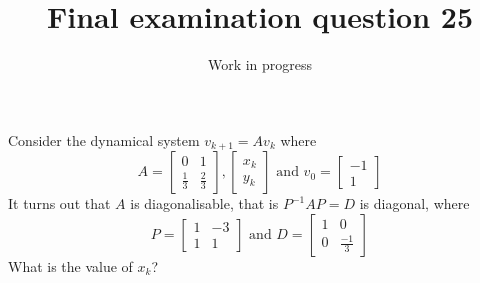 \documentclass{article}
\title{Final examination question 25}
\author{Work in progress}
\begin{document}
\maketitle

\begin{Exercise}
  Consider the dynamical system $v_{k+1} = A v_k$ where
  \begin{equation*}
  A = \left[
  \begin{array}{cc}
  0&1\\
  \frac{1}{3} & \frac{2}{3}
  \end{array}
  \right], \left[
  \begin{array}{c}
  x_k\\
  y_k
  \end{array}
  \right]\text{ and } v_0 = \left[
  \begin{array}{c}
  -1\\
  1
  \end{array}
  \right]
  \end{equation*}
  It turns out that $A$ is diagonalisable, that is $P^{-1}AP = D$ is diagonal, where
  \begin{equation*}
  P= \left[
  \begin{array}{cc}
  1&-3\\
  1&1
  \end{array}
  \right]\text{ and }
  D = \left[
  \begin{array}{cc}
  1&0\\
  0&\frac{-1}{3}
  \end{array}
  \right]
  \end{equation*}
  What is the value of $x_k$?
\end{Exercise}
\end{document}
